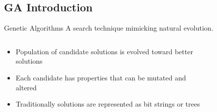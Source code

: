 \documentclass[compress]{beamer}
\begin{document}
\subsection{GA Introduction}
\begin{frame}{Genetic Algorithms}
A search technique mimicking natural evolution.
\begin{columns}[onlytextwidth]
  \begin{column}{0.45\textwidth}
    \small
    \begin{itemize}
      \item Population of candidate solutions is evolved toward better solutions
      \item Each candidate has properties that can be mutated and altered
      \item Traditionally solutions are represented as bit strings or trees
    \end{itemize}
    \end{column}
  \begin{column}{0.45\textwidth}
    \begin{figure}
		\tiny
		\begin{algorithmic}
        \ENDFOR
        \ENDFOR
      \ENDWHILE
    \end{algorithmic}
    \end{figure}
  \end{column}
\end{columns}
\end{frame}
\end{document}
